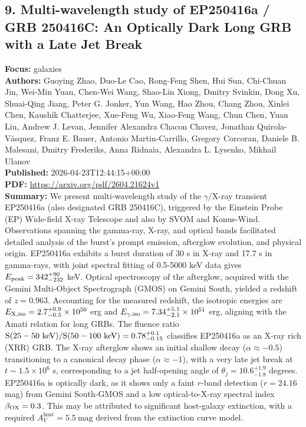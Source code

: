 \documentclass[11pt]{article}
\begin{document}
\subsection*{9. Multi-wavelength study of EP250416a / GRB 250416C: An Optically Dark Long GRB with a Late Jet Break}
\textbf{Focus:} galaxies\\
\textbf{Authors:} Guoying Zhao, Duo-Le Cao, Rong-Feng Shen, Hui Sun, Chi-Chuan Jin, Wei-Min Yuan, Chen-Wei Wang, Shao-Lin Xiong, Dmitry Svinkin, Dong Xu, Shuai-Qing Jiang, Peter G. Jonker, Yun Wang, Hao Zhou, Chang Zhou, Xinlei Chen, Kaushik Chatterjee, Xue-Feng Wu, Xiao-Feng Wang, Chun Chen, Yuan Liu, Andrew J. Levan, Jennifer Alexandra Chacon Chavez, Jonathan Quirola-Vásquez, Franz E. Bauer, Antonio Martin-Carrillo, Gregory Corcoran, Daniele B. Malesani, Dmitry Frederiks, Anna Ridnaia, Alexandra L. Lysenko, Mikhail Ulanov\\
\textbf{Published:} 2026-04-23T12:44:15+00:00\\
\textbf{PDF:} \href{https://arxiv.org/pdf/2604.21624v1}{https://arxiv.org/pdf/2604.21624v1}\\
\textbf{Summary:}
We present multi-wavelength study of the $\gamma $/X-ray transient EP250416a (also designated GRB 250416C), triggered by the Einstein Probe (EP) Wide-field X-ray Telescope and also by SVOM and Konus-Wind. Observations spanning the gamma-ray, X-ray, and optical bands facilitated detailed analysis of the burst's prompt emission, afterglow evolution, and physical origin. EP250416a exhibits a burst duration of 30 s in X-ray and 17.7 s in gamma-rays, with joint spectral fitting of 0.5-5000 keV data gives $E\rm_{peak}=342_{-232}^{+90}$ keV. Optical spectroscopy of the afterglow, acquired with the Gemini Multi-Object Spectrograph (GMOS) on Gemini South, yielded a redshift of $z=0.963$. Accounting for the measured redshift, the isotropic energies are $E\rm_{X,iso}=2.7_{-0.5}^{+0.9}\times10^{50}$ erg and $E\rm_{\gamma ,iso}=7.34_{-2.1}^{+5.1}\times10^{51}$ erg, aligning with the Amati relation for long GRBs. The fluence ratio $\rm S(25-50~keV)/S(50-100~keV)=0.78_{-0.15}^{+0.1}$ classifies EP250416a as an X-ray rich (XRR) GRB. The X-ray afterglow shows an initial shallow decay ($\alpha \approx -0.5$) transitioning to a canonical decay phase ($\alpha \approx -1$), with a very late jet break at $t\sim 1.5\times 10^6$ s, corresponding to a jet half-opening angle of $θ_j=10.6_{-1.8}^{+1.9}$ degrees. EP250416a is optically dark, as it shows only a faint $r$-band detection ($r=24.16$ mag) from Gemini South-GMOS and a low optical-to-X-ray spectral index $\beta _{\rm OX} = 0.3$. This may be attributed to significant host-galaxy extinction, with a required $A_V^{\text{host}}=5.5\ \text{mag}$ derived from the extinction curve model.
\end{document}
